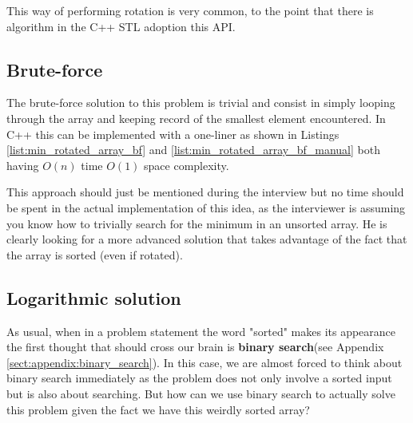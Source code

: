 This way of performing rotation is very common, to the point that there is algorithm in the C++ STL\cite{cit::std::rotate} adoption this API.


\subsection{Brute-force}
\label{min_rotated_array:sec:bruteforce}
The brute-force solution to this problem is trivial and consist in simply looping through the array and keeping record of the smallest element encountered. In C++ this can be implemented with a one-liner as shown in Listings \ref{list:min_rotated_array_bf} and \ref{list:min_rotated_array_bf_manual} both having $O(n)$ time $O(1)$ space complexity.






This approach should just be mentioned during the interview but no time should be spent in the actual implementation of this idea, as the interviewer is assuming you know how to trivially search for the minimum in an unsorted array. He is clearly looking for a more advanced solution that takes advantage of the fact that the array is sorted (even if rotated).

\subsection{Logarithmic solution}
\label{min_rotated_array:sec:log}
As usual, when in a problem statement the word "sorted" makes its appearance the first thought that should cross our brain is \textbf{binary search}(see Appendix \ref{sect:appendix:binary_search}). In this case, we are almost forced to think about binary search immediately as the problem does not only involve a sorted input but is also about searching. But how can we use binary search to actually solve this problem given the fact we have this weirdly sorted array? 

